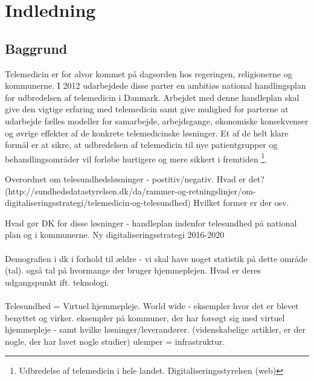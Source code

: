 \chapter{Indledning}

\section{Baggrund}




Telemedicin er for alvor kommet på dagsorden hos regeringen, religionerne og kommunerne. I 2012 udarbejdede disse parter en ambitiøs national handlingsplan for udbredelsen af telemedicin i Danmark. Arbejdet med denne handleplan skal give den vigtige erfaring med telemedicin samt give mulighed for parterne at udarbejde fælles modeller for samarbejde, arbejdsgange, økonomiske konsekvenser og øvrige effekter af de konkrete telemedicinske løsninger. Et af de helt klare formål er at sikre, at udbredelsen af telemedicin til nye patientgrupper og behandlingsområder vil forløbe hurtigere og mere sikkert i fremtiden \footnote{Udbredelse af telemedicin i hele landet. Digitaliseringsstyrelsen (web)}.


Overordnet om telesundhedsløsninger - postitiv/negativ. Hvad er det? (http://sundhedsdatastyrelsen.dk/da/rammer-og-retningslinjer/om-digitaliseringsstrategi/telemedicin-og-telesundhed) Hvilket former er der osv. 


Hvad gør DK for disse løsninger - handleplan indenfor telesundhed på national plan og i kommunerne. Ny digitaliseringsstrategi 2016-2020
\\ \\
Demografien i dk i forhold til ældre - vi skal have noget statistik på dette område (tal). også tal på hvormange der bruger hjemmeplejen. Hvad er deres udgangspunkt ift. teknologi. 
\\ \\
Telesundhed = Virtuel hjemmepleje. World wide - eksempler hvor det er blevet benyttet og virker. eksempler på kommuner, der har forsøgt sig med virtuel hjemmepleje - samt hvilke løsninger/leverandører. (videnskabelige artikler, er der nogle, der har lavet nogle studier) 
ulemper = infrastruktur.
 

